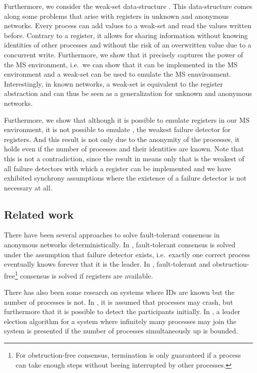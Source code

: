 \documentclass[conference, compsoc]{IEEEtran}
\begin{document}
Furthermore, we consider the weak-set data-structure \cite{DF}. This data-structure comes along some problems that arise with registers in unknown and anonymous networks. Every process can add values to a weak-set and read the values written before. Contrary to a register, it allows for sharing information without knowing identities of other processes and without the risk of an overwritten value due to a concurrent write. Furthermore, we show that it precisely captures the power of the MS environment, i.e.~we can show that it can be implemented in the MS environment and a weak-set can be used to emulate the MS ennvironment. Interestingly, in known networks, a weak-set is equivalent to the register abstraction and can thus be seen as a generalization for unknown and anonymous networks.     

Furthermore, we show that although it is possible to emulate registers in our MS environment, it is not possible to emulate  \cite{200377/IC}, the weakest failure detector for registers. And this result is not only due to the anonymity of the processes, it holds even if the number of processes and their identities are known. Note that this is not a contradiction, since the result in \cite{200377/IC} means only that  is the weakest of all failure detectors with which a register can be implemented and we have exhibited synchrony assumptions where the existence of a failure detector is not necessary at all.

\subsection{Related work}

There have been several approaches to solve fault-tolerant consensus in anonymous networks deterministically. In \cite{DF}, fault-tolerant consensus is solved under the assumption that failure detector  \cite{journals/jacm/ChandraHT96} exists, i.e.~exactly one correct process eventually knows forever that it is the leader.    
In \cite{DBLP:journals/dc/GuerraouiR07}, fault-tolerant and obstruction-free\footnote{For obstruction-free consensus, termination is only guaranteed if a process can take enough steps without beeing interrupted by other processes.} consensus is solved if registers are available.


There has also been some research on systems where IDs are known but the number of processes is not. In \cite{1253054}, it is assumed that processes may crash, but furthermore that it is possible to detect the participants initially. In \cite{1432337}, a leader election algorithm for a system where infinitely many processes may join the system is presented if the number of processes simultaneously up is bounded.
\end{document}
